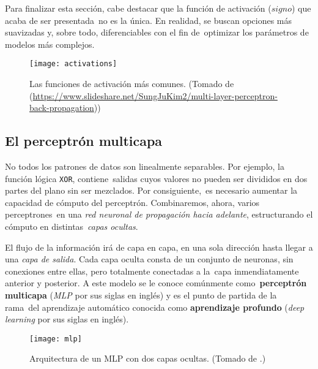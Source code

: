 Para finalizar esta sección, cabe destacar que la función de activación ($signo$) que acaba de ser presentada\
no es la única. En realidad, se buscan opciones más suavizadas y, sobre todo, diferenciables con el fin de\
optimizar los parámetros de modelos más complejos.

\begin{figure}[H]
  \centering
  \texttt{[image: activations]}
  \caption{Las funciones de activación más comunes.
    (Tomado de (\url{https://www.slideshare.net/SungJuKim2/multi-layer-perceptron-back-propagation}))}
\end{figure}

\subsection{El perceptrón multicapa}

\noindent
No todos los patrones de datos son linealmente separables. Por ejemplo, la función lógica \verb+XOR+, contiene\
salidas cuyos valores no pueden ser divididos en dos partes del plano sin ser mezclados. Por consiguiente,\
es necesario aumentar la capacidad de cómputo del perceptrón. Combinaremos, ahora, varios perceptrones\
en una \emph{red neuronal de propagación hacia adelante}, estructurando el cómputo en distintas\
\emph{capas ocultas}.\par
El flujo de la información irá de capa en capa, en una sola dirección hasta llegar a una \emph{capa de salida}.
Cada capa oculta consta de un conjunto de neuronas, sin conexiones entre ellas, pero totalmente conectadas a la\
capa inmendiatamente anterior y posterior. A este modelo se le conoce comúnmente como\
\textbf{perceptrón multicapa} (\emph{MLP} por sus siglas en inglés) y es el punto de partida de la rama\
del aprendizaje automático conocida como \textbf{aprendizaje profundo} (\emph{deep learning} por sus siglas en inglés).

\begin{figure}[H]
  \centering
  \texttt{[image: mlp]}
  \caption{Arquitectura de un MLP con dos capas ocultas.
    (Tomado de \cite{haykin2009}.)}
\end{figure}

